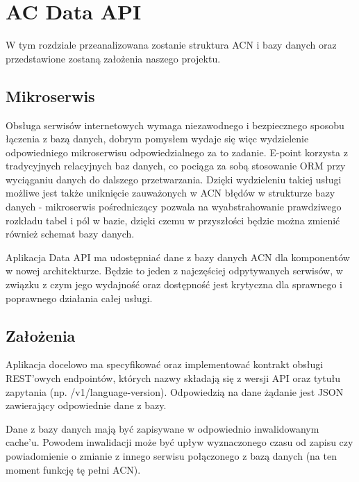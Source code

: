 \documentclass[licencjacka]{pracamgr}
\begin{document}
\chapter{AC Data API}

W tym rozdziale przeanalizowana zostanie struktura ACN i bazy danych oraz przedstawione zostaną założenia naszego projektu.

\section{Mikroserwis}

Obsługa serwisów internetowych wymaga niezawodnego i bezpiecznego sposobu łączenia z bazą danych, dobrym pomysłem wydaje się więc wydzielenie odpowiedniego mikroserwisu odpowiedzialnego za to zadanie. E-point korzysta z tradycyjnych relacyjnych baz danych, co pociąga za sobą stosowanie ORM przy wyciąganiu danych do dalszego przetwarzania. Dzięki wydzieleniu takiej usługi możliwe jest także uniknięcie zauważonych w ACN błędów w strukturze bazy danych - mikroserwis pośredniczący pozwala na wyabstrahowanie prawdziwego rozkładu tabel i pól w bazie, dzięki czemu w przyszłości będzie można zmienić również schemat bazy danych.

\vspace{1mm}

Aplikacja Data API ma udostępniać dane z bazy danych ACN dla komponentów w nowej architekturze. Będzie to jeden z najczęściej odpytywanych serwisów, w związku z czym jego wydajność oraz dostępność jest krytyczna dla sprawnego i poprawnego działania całej usługi.

\section{Założenia}

Aplikacja docelowo ma specyfikować oraz implementować kontrakt obsługi REST’owych endpointów, których nazwy składają się z wersji API oraz tytułu zapytania (np. /v1/language-version). Odpowiedzią na dane żądanie jest JSON zawierający odpowiednie dane z bazy.

\vspace{1mm}

Dane z bazy danych mają być zapisywane w odpowiednio inwalidowanym cache’u. Powodem inwalidacji może być upływ wyznaczonego czasu od zapisu czy powiadomienie o zmianie z innego serwisu połączonego z bazą danych (na ten moment funkcję tę pełni ACN).

\vspace{1mm}
	
\end{document}
